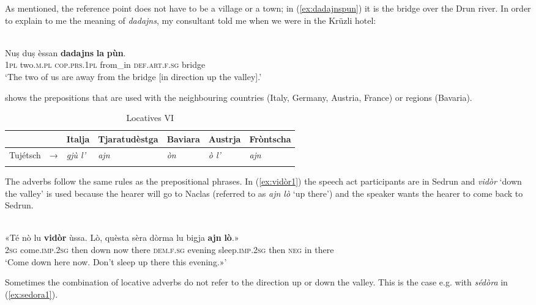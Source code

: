As mentioned, the reference point does not have to be a village or a town; in (\ref{ex:dadajnspun}) it is the bridge over the Drun river. In order to explain to me the meaning of \textit{dadajns}, my consultant told me when we were in the Krüzli hotel:

\ea
\label{ex:dadajnspun}
\\
\gll Nuṣ duṣ èssan \textbf{dadajns} \textbf{la} \textbf{pùn}.\\
\textsc{1pl} two.\textsc{m.pl} \textsc{cop.prs.1pl} from\_in \textsc{def.art.f.sg} bridge\\
\glt `The two of us are away from the bridge [in direction up the valley].'
\z


 shows the prepositions that are used with the neighbouring countries (Italy, Germany, Austria, France) or regions (Bavaria).

\begin{table}
	\caption{Locatives VI}
	\label{loc6}
	\begin{tabular}{lllllll}
		\lsptoprule
		& & Italja & Tjaratudèstga  & Baviara & Austrja & Fròntscha\\ 
		\midrule
		Tujétsch  &    →& \textit{gjù l'} &  \textit{ajn}   &  \textit{òn} & \textit{ò l'} & \textit{ajn}\\
		\lspbottomrule
	\end{tabular}
\end{table}

The adverbs follow the same rules as the prepositional phrases. In (\ref{ex:vidòr1}) the speech act participants are in Sedrun and \textit{vidòr} `down the valley' is used because the hearer will go to Naclas (referred to as \textit{ajn lò} `up there') and the speaker wants the hearer to come back to Sedrun.

\ea
\label{ex:vidòr1}
\\
\gll «Té nò lu \textbf{vidòr} ùssa. Lò, quèsta sèra dòrma lu bigja \textbf{ajn} \textbf{lò}.»\\
\textsc{2sg} come.\textsc{imp.2sg} then down now there  \textsc{dem.f.sg} evening sleep.\textsc{imp.2sg} then \textsc{neg} in there\\
\glt `Come down here now. Don’t sleep up there this evening.»'
\z

Sometimes the combination of locative adverbs do not refer to the direction up or down the valley. This is the case e.g. with \textit{sédòra} in (\ref{ex:sedora1}).

